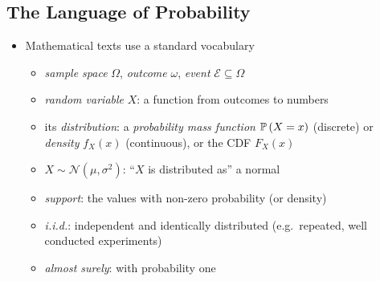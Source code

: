 \begin{slide}
\section[-2]{The Language of Probability}

\begin{PauseHighLight}
  \begin{itemize}\squeeze
  \item Mathematical texts use a standard vocabulary\pause
    \begin{itemize}
    \item \emph{sample space} $\Omega$, \emph{outcome} $\omega$,
      \emph{event} $\mathcal{E}\subseteq\Omega$\pause
    \item \emph{random variable} $X$: a function from outcomes to
      numbers\pause
    \item its \emph{distribution}: a \emph{probability mass function}
      $\mathbb{P}\left( X=x \right)$ (discrete) or \emph{density} $f_X(x)$ (continuous),
      or the CDF $F_X(x)$\pause
    \item $X\sim\mathcal{N}(\mu,\sigma^2)$: ``$X$ is distributed as'' a
      normal\pause
    \item \emph{support}: the values with non-zero probability (or
      density)\pause
    \item \emph{i.i.d.}: independent and identically distributed (e.g.\
      repeated, well conducted experiments)\pause
    \item \emph{almost surely}: with probability one\pause
    \end{itemize}
  \end{itemize}
\end{PauseHighLight}

\end{slide}

\Outline %

